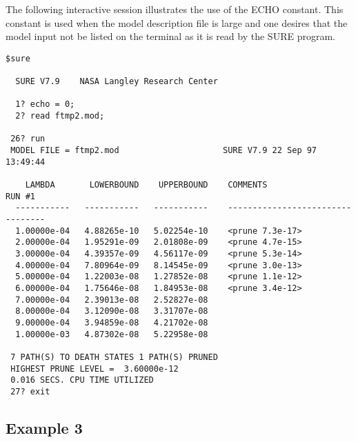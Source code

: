The following interactive session illustrates the use of the {\isf ECHO}
constant.  This constant is used when the model description file is large and
one desires that the model input not be listed on the terminal as it is read
by the SURE program.
\begin{verbatim}
$sure

  SURE V7.9    NASA Langley Research Center

  1? echo = 0;
  2? read ftmp2.mod;

 26? run
 MODEL FILE = ftmp2.mod                     SURE V7.9 22 Sep 97  13:49:44
 
    LAMBDA       LOWERBOUND    UPPERBOUND    COMMENTS                 RUN #1
  -----------   -----------   -----------    ---------------------------------
  1.00000e-04   4.88265e-10   5.02254e-10    <prune 7.3e-17>
  2.00000e-04   1.95291e-09   2.01808e-09    <prune 4.7e-15>
  3.00000e-04   4.39357e-09   4.56117e-09    <prune 5.3e-14>
  4.00000e-04   7.80964e-09   8.14545e-09    <prune 3.0e-13>
  5.00000e-04   1.22003e-08   1.27852e-08    <prune 1.1e-12>
  6.00000e-04   1.75646e-08   1.84953e-08    <prune 3.4e-12>
  7.00000e-04   2.39013e-08   2.52827e-08
  8.00000e-04   3.12090e-08   3.31707e-08
  9.00000e-04   3.94859e-08   4.21702e-08
  1.00000e-03   4.87302e-08   5.22958e-08

 7 PATH(S) TO DEATH STATES 1 PATH(S) PRUNED
 HIGHEST PRUNE LEVEL =  3.60000e-12
 0.016 SECS. CPU TIME UTILIZED
 27? exit
\end{verbatim}

\subsection{Example 3}


